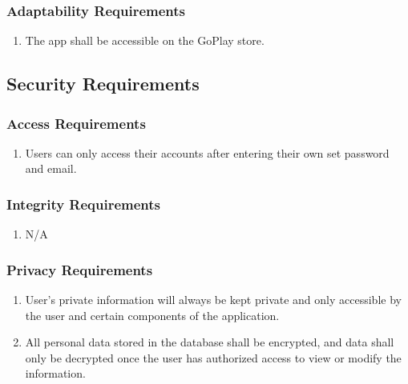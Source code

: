 \documentclass[]{article}
\begin{document}
\subsubsection{Adaptability Requirements}
\label{ssub:adaptability_requirements}
\begin{enumerate}[{MS-A}1. ]
	\item The app shall be accessible on the GoPlay store.
\end{enumerate}


\subsection{Security Requirements}
\label{sub:security_requirements}

\subsubsection{Access Requirements}
\label{ssub:access_requirements}
\begin{enumerate}[{SR-AC}1. ]
	\item Users can only access their accounts after entering their own set password and email.
\end{enumerate}

\subsubsection{Integrity Requirements}
\label{ssub:integrity_requirements}
\begin{enumerate}[{SR-INT}1. ]
	\item N/A
\end{enumerate}

\subsubsection{Privacy Requirements}
\label{ssub:privacy_requirements}
\begin{enumerate}[{SR-P}1. ]
	\item User's private information will always be kept private and only accessible by the user and certain components of the application.
	\item All personal data stored in the database shall be encrypted, and data shall only be decrypted once the user has authorized access to view or modify the information. 
\end{enumerate}
\end{document}
